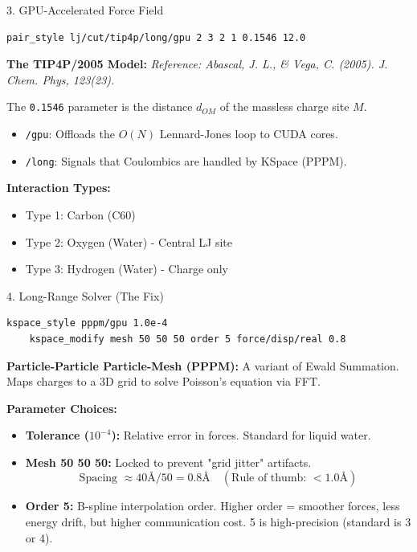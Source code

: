 \documentclass[aspectratio=169, 10pt]{beamer}
\begin{document}
\begin{frame}[fragile]{3. GPU-Accelerated Force Field}
    \begin{lstlisting}[language=bash]
    pair_style lj/cut/tip4p/long/gpu 2 3 2 1 0.1546 12.0
    \end{lstlisting}

    \textbf{The TIP4P/2005 Model:}
    \textit{Reference: Abascal, J. L., \& Vega, C. (2005). J. Chem. Phys, 123(23).}
    
    The \texttt{0.1546} parameter is the distance $d_{OM}$ of the massless charge site $M$.
    \begin{itemize}
        \item \texttt{/gpu}: Offloads the $O(N)$ Lennard-Jones loop to CUDA cores.
        \item \texttt{/long}: Signals that Coulombics are handled by KSpace (PPPM).
    \end{itemize}
    
    \textbf{Interaction Types:}
    \begin{itemize}
        \item Type 1: Carbon (C60)
        \item Type 2: Oxygen (Water) - Central LJ site
        \item Type 3: Hydrogen (Water) - Charge only
    \end{itemize}
\end{frame}

\begin{frame}[fragile]{4. Long-Range Solver (The Fix)}
    \begin{lstlisting}[language=bash]
    kspace_style pppm/gpu 1.0e-4
    kspace_modify mesh 50 50 50 order 5 force/disp/real 0.8
    \end{lstlisting}

    \textbf{Particle-Particle Particle-Mesh (PPPM):}
    A variant of Ewald Summation. Maps charges to a 3D grid to solve Poisson's equation via FFT.
    
    \textbf{Parameter Choices:}
    \begin{itemize}
        \item \textbf{Tolerance ($10^{-4}$):} Relative error in forces. Standard for liquid water.
        \item \textbf{Mesh 50 50 50:} Locked to prevent "grid jitter" artifacts.
        \[ \text{Spacing } \approx 40\text{\AA} / 50 = 0.8 \text{\AA} \quad (\text{Rule of thumb: } < 1.0 \text{\AA}) \]
        \item \textbf{Order 5:} B-spline interpolation order. Higher order = smoother forces, less energy drift, but higher communication cost. 5 is high-precision (standard is 3 or 4).
    \end{itemize}
\end{frame}
\end{document}
